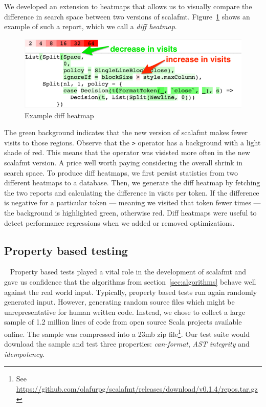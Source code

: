 We developed an extension to heatmaps that allows us to visually compare the difference in search space between two versions of scalafmt.
Figure~\ref{fig:heatmap2} shows an example of such a report, which we call a \emph{diff heatmap}.
\begin{figure}
  \centering
  \includegraphics[width=\textwidth]{img/heatmap2-annot.png}
  \caption{Example diff heatmap}
  \label{fig:heatmap2}
\end{figure}
The green background indicates that the new version of scalafmt makes fewer visits to those regions.
Observe that the \texttt{>} operator has a background with a light shade of red.
This means that the operator was visisted more often in the new scalafmt version.
A price well worth paying considering the overall shrink in search space.
To produce diff heatmaps, we first persist statistics from two different heatmaps to a database.
Then, we generate the diff heatmap by fetching the two reports and calculating the difference in visits per token.
If the difference is negative for a particular token --- meaning we visited that token fewer times --- the background is highlighted green, otherwise red.
Diff heatmaps were useful to detect performance regressions when we added or removed optimizations.

\subsection{Property based testing}~\label{sec:testing}
Property based tests played a vital role in the development of scalafmt and gave us confidence that the algorithms from section~\ref{sec:algorithms} behave well against the real world input.
Typically, property based tests run again randomly generated input.
However, generating random source files which might be unrepresentative for human written code.
Instead, we chose to collect a large sample of 1.2 million lines of code from open source Scala projects available online.
The sample was compressed into a 23mb zip file\footnote{See \url{https://github.com/olafurpg/scalafmt/releases/download/v0.1.4/repos.tar.gz}}.
Our test suite would download the sample and test three properties: \emph{can-format}, \emph{AST integrity} and \emph{idempotency}.

